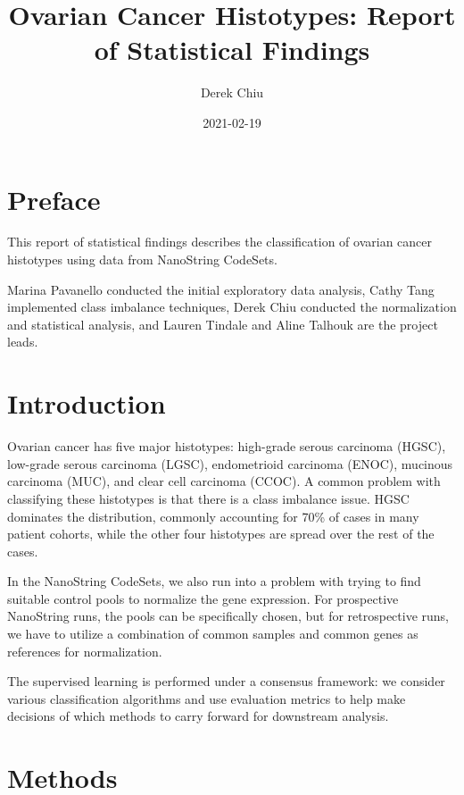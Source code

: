 \documentclass[
]{report}
\title{Ovarian Cancer Histotypes: Report of Statistical Findings}
\author{Derek Chiu}
\date{2021-02-19}
\begin{document}
\maketitle

{
\hypersetup{linkcolor=}
\setcounter{tocdepth}{1}
\tableofcontents
}
\listoftables
\listoffigures
\hypertarget{preface}{%
\chapter*{Preface}\label{preface}}

This report of statistical findings describes the classification of ovarian cancer histotypes using data from NanoString CodeSets.

Marina Pavanello conducted the initial exploratory data analysis, Cathy Tang implemented class imbalance techniques, Derek Chiu conducted the normalization and statistical analysis, and Lauren Tindale and Aline Talhouk are the project leads.

\hypertarget{introduction}{%
\chapter{Introduction}\label{introduction}}

Ovarian cancer has five major histotypes: high-grade serous carcinoma (HGSC), low-grade serous carcinoma (LGSC), endometrioid carcinoma (ENOC), mucinous carcinoma (MUC), and clear cell carcinoma (CCOC). A common problem with classifying these histotypes is that there is a class imbalance issue. HGSC dominates the distribution, commonly accounting for 70\% of cases in many patient cohorts, while the other four histotypes are spread over the rest of the cases.

In the NanoString CodeSets, we also run into a problem with trying to find suitable control pools to normalize the gene expression. For prospective NanoString runs, the pools can be specifically chosen, but for retrospective runs, we have to utilize a combination of common samples and common genes as references for normalization.

The supervised learning is performed under a consensus framework: we consider various classification algorithms and use evaluation metrics to help make decisions of which methods to carry forward for downstream analysis.

\hypertarget{methods}{%
\chapter{Methods}\label{methods}}
\end{document}
